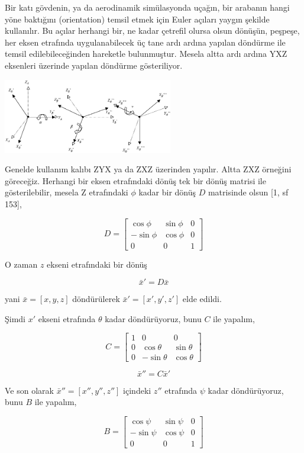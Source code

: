 \documentclass[12pt,fleqn]{article}\usepackage{../../common}
\begin{document}
Bir katı gövdenin, ya da aerodinamik simülasyonda uçağın, bir arabanın hangi
yöne baktığını (orientation) temsil etmek için Euler açıları yaygın şekilde
kullanılır. Bu açılar herhangi bir, ne kadar çetrefil olursa olsun dönüşün,
peşpeşe, her eksen etrafında uygulanabilecek üç tane ardı ardına yapılan
döndürme ile temsil edilebileceğinden hareketle bulunmuştur. Mesela altta ardı
ardına YXZ eksenleri üzerinde yapılan döndürme gösteriliyor.

\includegraphics[width=20em]{phy_072_rot_06.png}

Genelde kullanım kalıbı ZYX ya da ZXZ üzerinden yapılır. Altta ZXZ örneğini
göreceğiz. Herhangi bir eksen etrafındaki dönüş tek bir dönüş matrisi ile
gösterilebilir, mesela Z etrafındaki $\phi$ kadar bir dönüş $D$ matrisinde olsun
[1, sf 153],

$$
D = \left[\begin{array}{rrr}
\cos \phi & \sin\phi & 0 \\
-\sin \phi & \cos\phi & 0 \\
0 & 0 & 1
\end{array}\right]
$$

O zaman $z$ ekseni etrafındaki bir dönüş

$$
\bar{x}' = D \bar{x}
$$

yani $\bar{x} = [x, y, z]$ döndürülerek $\bar{x}' = [x', y', z']$ elde edildi.

Şimdi $x'$ ekseni etrafında $\theta$ kadar döndürüyoruz, bunu $C$ ile yapalım,

$$
C = \left[\begin{array}{rrr}
1 & 0 & 0 \\
0 & \cos\theta & \sin\theta \\
0 & -\sin\theta & \cos\theta
\end{array}\right]
$$

$$
\bar{x}'' = C \bar{x}'
$$

Ve son olarak $\bar{x}'' = [x'',y'',z'']$ içindeki $z''$ etrafında $\psi$ kadar
döndürüyoruz, bunu $B$ ile yapalım,

$$
B = \left[\begin{array}{rrr}
\cos \psi & \sin\psi & 0 \\
-\sin \psi & \cos\psi & 0 \\
0 & 0 & 1
\end{array}\right]
$$
\end{document}
